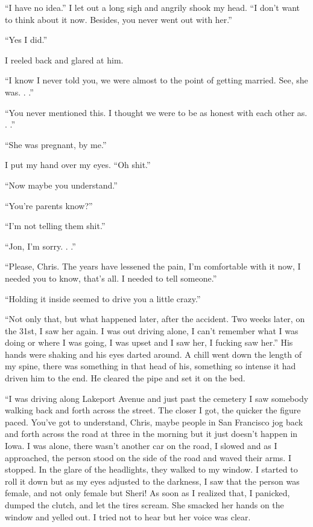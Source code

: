 ``I have no idea.'' I let out a long sigh and angrily shook my head. ``I
don't want to think about it now. Besides, you never went out with
her.''

``Yes I did.''

I reeled back and glared at him.

``I know I never told you, we were almost to the point of getting
married. See, she was. . .''

``You never mentioned this. I thought we were to be as honest with each
other as. . .''

``She was pregnant, by me.''

I put my hand over my eyes. ``Oh shit.''

``Now maybe you understand.''

``You're parents know?''

``I'm not telling them shit.''

``Jon, I'm sorry. . .''

``Please, Chris. The years have lessened the pain, I'm comfortable with
it now, I needed you to know, that's all. I needed to tell someone.''

``Holding it inside seemed to drive you a little crazy.''

``Not only that, but what happened later, after the accident. Two weeks
later, on the 31st, I saw her again. I was out driving alone, I can't
remember what I was doing or where I was going, I was upset and I saw
her, I fucking saw her.'' His hands were shaking and his eyes darted
around. A chill went down the length of my spine, there was something in
that head of his, something so intense it had driven him to the end. He
cleared the pipe and set it on the bed.

``I was driving along Lakeport Avenue and just past the cemetery I saw
somebody walking back and forth across the street. The closer I got, the
quicker the figure paced. You've got to understand, Chris, maybe people
in San Francisco jog back and forth across the road at three in the
morning but it just doesn't happen in Iowa. I was alone, there wasn't
another car on the road, I slowed and as I approached, the person stood
on the side of the road and waved their arms. I stopped. In the glare of
the headlights, they walked to my window. I started to roll it down but
as my eyes adjusted to the darkness, I saw that the person was female,
and not only female but Sheri! As soon as I realized that, I panicked,
dumped the clutch, and let the tires scream. She smacked her hands on
the window and yelled out. I tried not to hear but her voice was clear.

